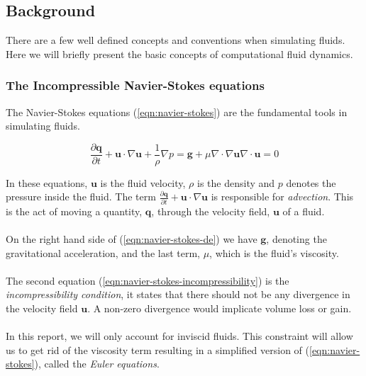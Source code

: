 \documentclass[twocolumn]{article}
\begin{document}
\subsection{Background}
There are a few well defined concepts and conventions when simulating fluids. Here we will briefly present the basic concepts of computational fluid dynamics.

\subsubsection{The Incompressible Navier-Stokes equations}
The Navier-Stokes equations (\ref{eqn:navier-stokes}) are the fundamental tools in simulating fluids. 

\begin{subequations}
\begin{equation}
    \frac{\partial \mathbf{q}}{\partial t} + \mathbf{u} \cdot \nabla \mathbf{u} + \frac{1}{\rho} \nabla p = \mathbf{g} + \mu \nabla \cdot \nabla \mathbf{u}
\label{eqn:navier-stokes-de}
\end{equation}
\begin{equation}
    \nabla \cdot \mathbf{u} = 0
\label{eqn:navier-stokes-incompressibility}
\end{equation}
\label{eqn:navier-stokes}
\end{subequations}

In these equations, $\mathbf{u}$ is the fluid velocity, $\rho$ is the density and $p$ denotes the pressure inside the fluid. The term $\frac{\partial \mathbf{q}}{\partial t} + \mathbf{u} \cdot \nabla \mathbf{u}$ is responsible for \emph{advection}. This is the act of moving a quantity, $\mathbf{q}$, through the velocity field, $\mathbf{u}$ of a fluid.
\\\\
On the right hand side of (\ref{eqn:navier-stokes-de}) we have $\mathbf{g}$, denoting the gravitational acceleration, and the last term, $\mu$, which is the fluid's viscosity.
\\\\
The second equation (\ref{eqn:navier-stokes-incompressibility}) is the \emph{incompressibility condition}, it states that there should not be any divergence in the velocity field $\mathbf{u}$. A non-zero divergence would implicate volume loss or gain.
\\\\
In this report, we will only account for inviscid fluids. This constraint will allow us to get rid of the viscosity term resulting in a simplified version of (\ref{eqn:navier-stokes}), called the \emph{Euler equations}.
\end{document}

